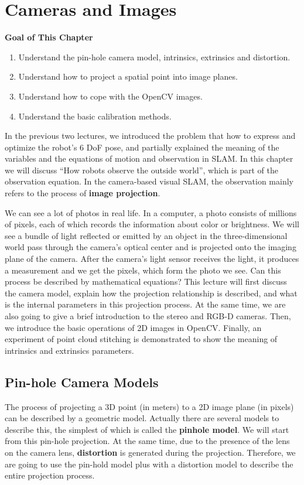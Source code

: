 \chapter{Cameras and Images}
\label{cpt:5}
\begin{mdframed}  
	\textbf{Goal of This Chapter}
	\begin{enumerate}[labelindent=0em,leftmargin=1.5em]
		\item Understand the pin-hole camera model, intrinsics, extrinsics and distortion. 
		\item Understand how to project a spatial point into image planes. 
		\item Understand how to cope with the OpenCV images. 
		\item Understand the basic calibration methods. 
	\end{enumerate}
\end{mdframed} 

In the previous two lectures, we introduced the problem that how to express and optimize the robot's 6 DoF pose, and partially explained the meaning of the variables and the equations of motion and observation in SLAM. In this chapter we will discuss ``How robots observe the outside world'', which is part of the observation equation. In the camera-based visual SLAM, the observation mainly refers to the process of \textbf{image projection}.

We can see a lot of photos in real life. In a computer, a photo consists of millions of pixels, each of which records the information about color or brightness. We will see a bundle of light reflected or emitted by an object in the three-dimensional world pass through the camera's optical center and is projected onto the imaging plane of the camera. After the camera's light sensor receives the light, it produces a measurement and we get the pixels, which form the photo we see. Can this process be described by mathematical equations? This lecture will first discuss the camera model, explain how the projection relationship is described, and what is the internal parameters in this projection process. At the same time, we are also going to give a brief introduction to the stereo and RGB-D cameras. Then, we introduce the basic operations of 2D images in OpenCV. Finally, an experiment of point cloud stitching is demonstrated to show the meaning of intrinsics and extrinsics parameters.

\newpage

\newpage
\section{Pin-hole Camera Models}
The process of projecting a 3D point (in meters) to a 2D image plane (in pixels) can be described by a geometric model. Actually there are several models to describe this, the simplest of which is called the \textbf{pinhole model}. We will start from this pin-hole projection. At the same time, due to the presence of the lens on the camera lens, \textbf{distortion} is generated during the projection. Therefore, we are going to use the pin-hold model plus with a distortion model to describe the entire projection process.

